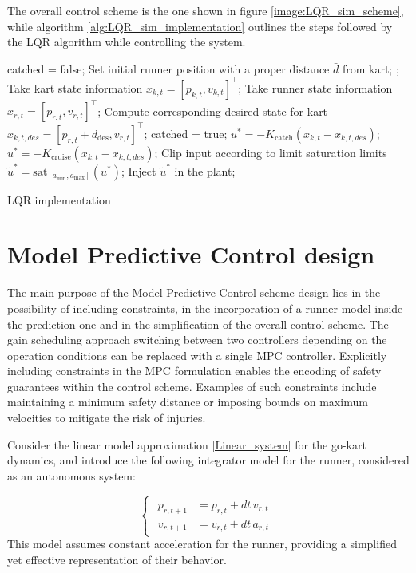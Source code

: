 \documentclass[a4paper,12pt,oneside]{book}
\begin{document}
\bigskip
The overall control scheme is the one shown in figure \ref{image:LQR_sim_scheme}, while algorithm \ref{alg:LQR_sim_implementation} outlines the steps followed by the LQR algorithm while controlling the system.

\begin{algorithm}
\begin{algorithmic}[1]
	\State catched = false;
	\State Set initial runner position with a proper distance $\bar{d}$ from kart;
	;
		\State Take kart state information $x_{k,t} = [p_{k,t}, v_{k,t}]^\top$;
		\State Take runner state information $x_{r,t} = [p_{r,t}, v_{r,t}]^\top$;
		\State Compute corresponding desired state for kart $x_{k,t,des} = [p_{r,t} + d_{\text{des}}, v_{r,t}]^\top$;
			\State catched = true;
		\EndIf
			\State $u^* = - K_{\text{catch}} (x_{k,t} - x_{k,t,des}) $;
		\Else 
			\State $u^* = - K_{\text{cruise}} (x_{k,t} - x_{k,t,des}) $;
		\EndIf
		\State Clip input according to limit saturation limits $\tilde{u}^* = \text{sat}_{[a_{\min}, a_{\max}]} (u^*)$;
		\State Inject $\tilde{u}^*$ in the plant;
	\EndFor
\caption{LQR implementation}
\label{alg:LQR_sim_implementation}
\end{algorithmic}
\end{algorithm}


\newpage
\newpage
\section{Model Predictive Control design}
The main purpose of the Model Predictive Control scheme design lies in the possibility of including constraints, in the incorporation of a runner model inside the prediction one and in the simplification of the overall control scheme.
The gain scheduling approach switching between two controllers depending on the operation conditions can be replaced with a single MPC controller.
Explicitly including constraints in the MPC formulation enables the encoding of safety guarantees within the control scheme. Examples of such constraints include maintaining a minimum safety distance or imposing bounds on maximum velocities to mitigate the risk of injuries.

\bigskip
Consider the linear model approximation \eqref{Linear_system} for the go-kart dynamics, and introduce the following integrator model for the runner, considered as an autonomous system:

\begin{equation}
\begin{cases}
	\begin{aligned}
		p_{r,t+1} &= p_{r,t} + dt \, v_{r,t} \\
		v_{r,t+1} &= v_{r,t} + dt \, a_{r,t}
	\end{aligned}
\end{cases}
\label{Runner_model}
\end{equation}
This model assumes constant acceleration for the runner, providing a simplified yet effective representation of their behavior.
\end{document}
